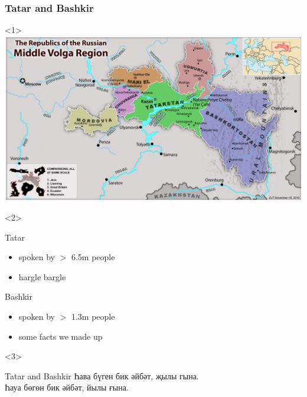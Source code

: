 \documentclass[10pt,xetex]{beamer} %
\begin{document}
\begin{frame}
  \frametitle{Tatar and Bashkir} %
  
  \begin{onlyenv}<1>
    \includegraphics[width=\textwidth]{middlevolga19001500.jpg}
  \end{onlyenv}
  \begin{onlyenv}<2>
    
    \begin{block}{Tatar}
      
      \begin{itemize}
        \item spoken by $>$ 6.5m  people
        \item hargle bargle %
      \end{itemize}
      
    \end{block}
      
    \begin{block}{Bashkir}
      
      \begin{itemize}
        \item spoken by $>$ 1.3m people
        \item some facts we made up %
      \end{itemize}
    
    \end{block}
    
  \end{onlyenv}
  \begin{onlyenv}<3>
  
    \begin{block}{Tatar and Bashkir}
      Һава бүген бик әйбәт, җылы гына.  \\
      Һауа бөгөн бик әйбәт, йылы ғына. \\
    \end{block}
    

\end{onlyenv}
\end{frame}
\end{document}
